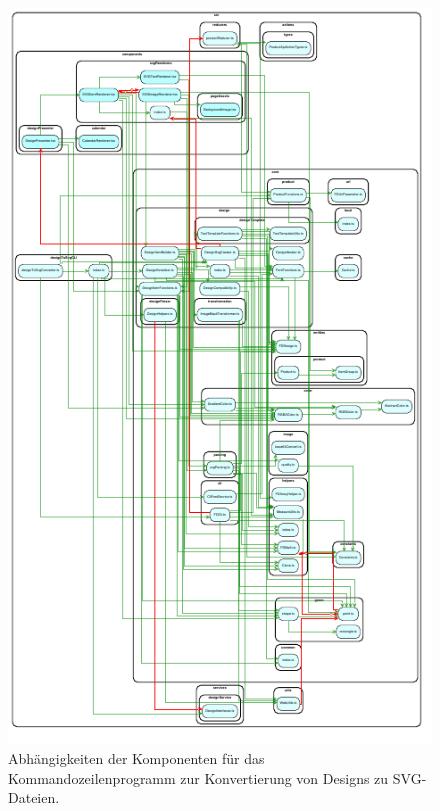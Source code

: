 \begin{figure}[H]
    \centering
    \includegraphics{diagrams/Ist-Architektur/designToSvgCLI-analysis.pdf}
    \caption{Abhängigkeiten der Komponenten für das Kommandozeilenprogramm zur Konvertierung von Designs zu SVG-Dateien.}
    \label{fig:DesignToSvg}
\end{figure}
\begin{multicols}{2}
    
\end{multicols}